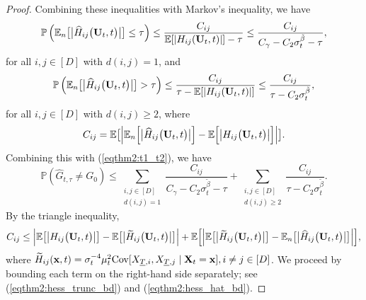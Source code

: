 \documentclass[11pt,a4paper,final]{article}
\numberwithin{equation}{section}
\theoremstyle{remark}
\newcommand{\bU}{{\bf U}}
\newcommand{\bx}{{\bf x}}
\newcommand{\bX}{{\bf X}}
\newcommand{\bbE}{{\mathbb E}}
\newcommand{\bbP}{{\mathbb P}}
\newcommand{\be}{\begin{equation}}
\newcommand{\ee}{\end{equation}}
\newcommand{\bean}{\setlength\arraycolsep{1pt}\begin{eqnarray*}}
\newcommand{\eean}{\end{eqnarray*}}
\begin{document}
\begin{proof}
Combining these inequalities with Markov's inequality, we have
\bean
 \bbP  \left( \bbE_{n} \big[  \big\vert \widehat H_{ij} \big( \bU_{t} , t \big)  \big\vert \big] \leq \tau \right)
 \leq  \frac{C_{ij}}{ \bbE [ \vert H_{ij} (\bU_{t},t) \vert ] - \tau }
 \leq \frac{C_{ij}}{ C_{\gamma} - C_{2} \sigma_{t}^{{\tilde \beta}} - \tau },
 \eean
for all $i,j \in [D]$ with $d(i,j) = 1$, and
 \bean
 \bbP  \left( \bbE_{n} \big[  \big\vert \widehat H_{ij} \big( \bU_{t} , t \big)  \big\vert \big] > \tau \right)
 \leq \frac{C_{ij}}{ \tau  - \bbE [ \vert H_{ij} (\bU_{t},t) \vert ]  }
 \leq  \frac{C_{ij}}{ \tau  - C_{2} \sigma_{t}^{{\tilde \beta}}  },
\eean
for all $i,j \in [D]$ with $d(i,j) \geq 2$,
where 
\bean
C_{ij} = \bbE \big[  \Big\vert \bbE_{n} \Big[  \big\vert \widehat H_{ij} \big( \bU_{t}, t \big)  \big\vert \Big] - \bbE \Big[  \big\vert  H_{ij} \big(  \bU_{t}, t \big)  \big\vert \Big] \Big\vert  \big].
\eean
Combining this with (\ref{eqthm2:t1_t2}), we have
\be
\bbP \left( \widehat G_{t,\tau} \neq G_{0} \right)
\leq
\sum_{ \substack {i,j \in [D]  \\ d(i,j) = 1 } } \frac{C_{ij}}{ C_{\gamma} - C_{2} \sigma_{t}^{{\tilde \beta}} - \tau }
+ \sum_{  \substack {i,j \in [D]  \\ d(i,j) \geq 2 } } \frac{C_{ij}}{ \tau  - C_{2} \sigma_{t}^{{\tilde \beta}}  }.
\label{eqthm2:markov}
\ee
By the triangle inequality, 
\bean
C_{ij}
\leq 
 \Big\vert  \bbE \big[  \big\vert H_{ij} \big( \bU_{t}, t \big)  \big\vert  \big] -  \bbE \big[   \big\vert \widetilde H_{ij} \big( \bU_{t}, t \big)  \big\vert \big]  \Big\vert 
 +
 \bbE \Big[  \Big\vert \bbE \big[  \big\vert \widetilde H_{ij} \big( \bU_{t}, t \big)  \big\vert \big] - \bbE_{n} \big[  \big\vert \widehat H_{ij} \big( \bU_{t}, t \big)  \big\vert \big] \Big\vert  \Big],
\eean
where $\widetilde H_{ij} (\bx,t) = \sigma_{t}^{-4} \mu_{t}^2 \text{Cov} [ X_{\underline{T}, i}, X_{\underline{T}, j} \mid \bX_{t} = \bx ], i \neq j \in [D]$.
We proceed by bounding each term on the right-hand side separately; see (\ref{eqthm2:hess_trunc_bd}) and (\ref{eqthm2:hess_hat_bd}).


\end{proof}
\end{document}
